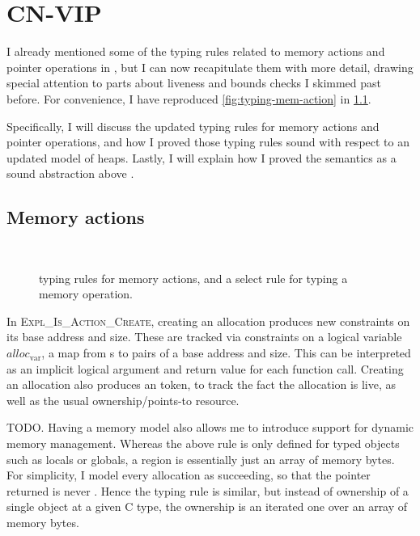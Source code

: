 \chapter{CN-VIP}\label{chap:cn-vip}

\margintoc{}

I already mentioned some of the typing rules related to memory actions and
pointer operations in , but I can now
recapitulate them with more detail, drawing special attention to parts about
liveness and bounds checks I skimmed past before. For convenience, I have
reproduced \cref{fig:typing-mem-action} in \cref{fig:cnvip-mem-action}.

Specifically, I will discuss the updated typing rules for memory actions and
pointer operations, and how I proved those typing rules sound with respect to
an updated model of  heaps. Lastly, I will explain how I proved the
 semantics as a sound abstraction above .

\section{Memory actions}

\begin{figure}[tp]
    \small
    \raggedright{}
    \cndefnAction{}
    \\%
    \onlyUseRules{\cndefnMemop{}}{%
        \cndruleMemopXXRelXXBinop{}
    }
    \caption{ typing rules for memory actions, and a select rule
        for typing a memory operation.}\label{fig:cnvip-mem-action}
\end{figure}

In \textsc{Expl\_Is\_Action\_Create}, creating an allocation produces new
constraints on its base address and size. These are tracked via constraints on a
logical variable $\mathit{alloc}_\mathrm{var}$, a map from s to
pairs of a base address and size. This can be interpreted as an implicit
logical argument and return value for each function call. Creating an
allocation also produces an  token, to track the fact the
allocation is live, as well as the usual ownership/points-to resource.

TODO\@. Having a memory model also allows me to introduce support for dynamic
memory management. Whereas the above rule is only defined for typed objects
such as locals or globals, a region is essentially just an array of memory
bytes. For simplicity, I model every allocation as succeeding, so that the
pointer returned is never . Hence the typing rule is similar,
but instead of ownership of a single object at a given C type, the ownership
is an iterated one over an array of memory bytes.

